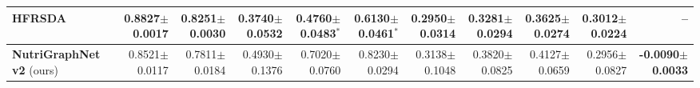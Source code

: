 \begin{table}[t]
{\begin{tabular}{lrrrrrrrrrr}
HFRSDA~\cite{yang2022hfrsda} & 0.8827\tiny{$\pm$0.0017} & 0.8251\tiny{$\pm$0.0030} & 0.3740\tiny{$\pm$0.0532} & 0.4760\tiny{$\pm$0.0483}$^{*}$ & 0.6130\tiny{$\pm$0.0461}$^{*}$ & 0.2950\tiny{$\pm$0.0314} & 0.3281\tiny{$\pm$0.0294} & 0.3625\tiny{$\pm$0.0274} & 0.3012\tiny{$\pm$0.0224} & -- \\
\midrule
\textbf{NutriGraphNet v2} (ours) & 0.8521\tiny{$\pm$0.0117} & 0.7811\tiny{$\pm$0.0184} & 0.4930\tiny{$\pm$0.1376} & 0.7020\tiny{$\pm$0.0760} & 0.8230\tiny{$\pm$0.0294} & 0.3138\tiny{$\pm$0.1048} & 0.3820\tiny{$\pm$0.0825} & 0.4127\tiny{$\pm$0.0659} & 0.2956\tiny{$\pm$0.0827} & \textbf{-0.0090\tiny{$\pm$0.0033}} \\
\bottomrule
\end{tabular}}
\end{table}